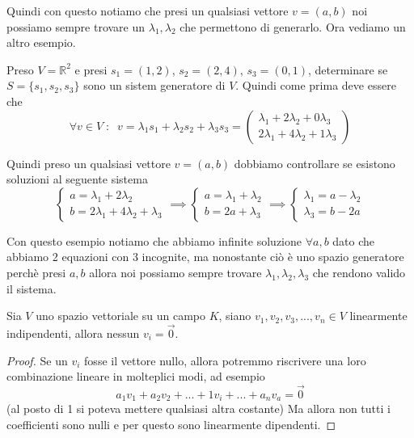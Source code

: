 \documentclass{rapport}
\begin{document}
Quindi con questo notiamo che presi un qualsiasi vettore $v=(a,b)$ noi possiamo sempre trovare un $\lambda_1, \lambda_2$ che permettono di generarlo. Ora vediamo un altro esempio. 

Preso $V = \mathbb{R}^2$ e presi $s_1 = (1,2)$, $s_2 = (2, 4)$, $s_3 = (0, 1)$, determinare se $S = \{s_1,s_2,s_3\}$ sono un sistem generatore di $V$. Quindi come prima deve essere che 
\[
\forall v \in V \; : \;\; v = \lambda_1 s_1 + \lambda_2 s_2 + \lambda_3 s_3  =  \begin{pmatrix}
  \lambda_1+2\lambda_2 + 0 \lambda_3\\
  2\lambda_1+4\lambda_2 + 1 \lambda_3
\end{pmatrix}
\]

Quindi preso un qualsiasi vettore $v =(a,b)$ dobbiamo controllare se esistono soluzioni al seguente sistema
\[
\begin{cases}
  a = \lambda_1+2\lambda_2  \\
  b = 2\lambda_1+4\lambda_2 + \lambda_3
\end{cases}\implies
\begin{cases}
  a = \lambda_1+\lambda_2  \\
  b =2a + \lambda_3
\end{cases} \implies
\begin{cases}
  \lambda_1 = a-\lambda_2  \\
  \lambda_3 =b-2a  
\end{cases} 
\]

Con questo esempio notiamo che abbiamo infinite soluzione $\forall a, b$ dato che abbiamo 2 equazioni con 3 incognite, ma nonostante ciò è uno spazio generatore perchè presi $a,b$ allora noi possiamo sempre trovare $\lambda_1, \lambda_2, \lambda_3$ che rendono valido il sistema.

\begin{teorema}{}{}
  Sia $V$ uno spazio vettoriale su un campo $K$, siano $v_1, v_2, v_3, ..., v_n \in V$ linearmente indipendenti, allora nessun $v_i = \vec{0}$.
\end{teorema}

\begin{proof}
  Se un $v_i$ fosse il vettore nullo, allora potremmo riscrivere una loro combinazione lineare in molteplici modi, ad esempio
  \[
  a_1v_1 + a_2v_2 + ... + 1 v_i + ... + a_n v_a = \vec{0}
  \]
  (al posto di 1 si poteva mettere qualsiasi altra costante) Ma allora non tutti i coefficienti sono nulli e per questo sono linearmente dipendenti.
\end{proof}
\end{document}
